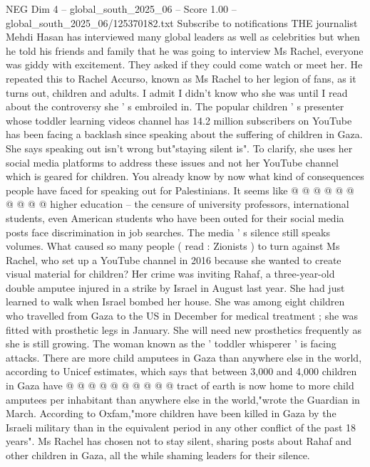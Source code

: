 \begin{textsample}{NEG Dim 4 – global\_south\_2025\_06 – Score 1.00 – global\_south\_2025\_06/125370182.txt}  \label{ex:f4_neg_104}
Subscribe to notifications THE journalist Mehdi Hasan has interviewed many global leaders as well as celebrities but when he told his friends and family that he was going to interview Ms Rachel, everyone was giddy with excitement.
They asked if they could come watch or meet her.
He repeated this to Rachel Accurso, known as Ms Rachel to her legion of fans, as it turns out, children and adults.
I admit I didn't know who she was until I read about the controversy she ' s embroiled in.
The popular children ' s presenter whose toddler learning videos channel has 14.2 million subscribers on YouTube has been facing a backlash since speaking about the suffering of children in Gaza.
She says speaking out isn't wrong but"staying silent is".
To clarify, she uses her social media platforms to address these issues and not her YouTube channel which is geared for children.
You already know by now what kind of consequences people have faced for speaking out for Palestinians.
It seems like @ @ @ @ @ @ @ @ @ @ higher education -- the censure of university professors, international students, even American students who have been outed for their social media posts face discrimination in job searches.
The media ' s silence still speaks volumes.
What caused so many people ( read : Zionists ) to turn against Ms Rachel, who set up a YouTube channel in 2016 because she wanted to create visual material for children?
Her crime was inviting Rahaf, a three-year-old double amputee injured in a strike by Israel in August last year.
She had just learned to walk when Israel bombed her house.
She was among eight children who travelled from Gaza to the US in December for medical treatment ; she was fitted with prosthetic legs in January.
She will need new prosthetics frequently as she is still growing.
The woman known as the ' toddler whisperer ' is facing attacks.
There are more child amputees in Gaza than anywhere else in the world, according to Unicef estimates, which says that between 3,000 and 4,000 children in Gaza have @ @ @ @ @ @ @ @ @ @ tract of earth is now home to more child amputees per inhabitant than anywhere else in the world,"wrote the Guardian in March.
According to Oxfam,"more children have been killed in Gaza by the Israeli military than in the equivalent period in any other conflict of the past 18 years".
Ms Rachel has chosen not to stay silent, sharing posts about Rahaf and other children in Gaza, all the while shaming leaders for their silence.

\end{textsample}
